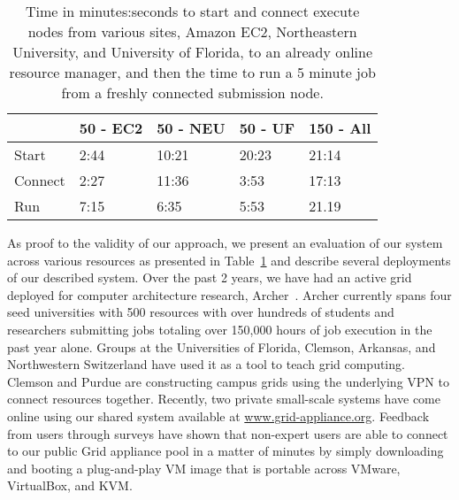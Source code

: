 \documentclass[conference]{IEEEtran}
\begin{document}
\begin{table}[ht]
\small{
\setlength{\itemsep}{0pt}
\setlength{\parskip}{0pt}
\centering
\begin{tabular}[c]{|m{1.0cm}||m{1.2cm}|m{1.2cm}|m{1.2cm}|m{1.2cm}|} \hline
& 50 - EC2 & 50 - NEU & 50 - UF & 150 - All \\ \hline\hline
Start & 2:44 & 10:21 & 20:23 & 21:14 \\ \hline
Connect & 2:27 & 11:36 & 3:53 & 17:13\\ \hline
Run & 7:15 & 6:35 & 5:53 & 21.19 \\ \hline
\end{tabular}
\caption{\small{Time in minutes:seconds to start and connect execute nodes from
various sites, Amazon EC2, Northeastern University, and University of Florida,
to an already online resource manager, and then the time to run a 5 minute job
from a freshly connected submission node.}}
\label{tab:results}
}
\end{table}

As proof to the validity of our approach, we present an evaluation of our
system across various resources as presented in Table~\ref{tab:results} and
describe several deployments of our described system.  Over the past 2 years,
we have had an active grid deployed for computer architecture research,
Archer~\cite{archer}.  Archer currently spans four seed universities with 500
resources with over hundreds of students and researchers submitting jobs
totaling over 150,000 hours of job execution in the past year alone.  Groups at
the Universities of Florida, Clemson, Arkansas, and Northwestern Switzerland
have used it as a tool to teach grid computing.  Clemson and Purdue are
constructing campus grids using the underlying VPN to connect resources
together.  Recently, two private small-scale systems have come online using our
shared system available at \url{www.grid-appliance.org}. Feedback from users
through surveys have shown that non-expert users are able to connect to our
public Grid appliance pool in a matter of minutes by simply downloading and
booting a plug-and-play VM image that is portable across VMware, VirtualBox,
and KVM.



\end{document}
